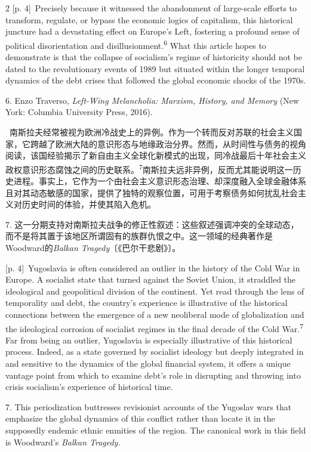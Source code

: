 \documentclass[10pt,a4paper]{article}
\begin{document}
\begin{paracol}{2}
\switchcolumn
{\scriptsize\color{gray} [p. 4]}\ Precisely because it witnessed the abandonment of large-scale efforts to transform, regulate, or bypass the economic logics of capitalism, this historical juncture had a devastating effect on Europe’s Left, fostering a profound sense of political disorientation and disillusionment.\nobreak\textsuperscript{6} What this article hopes to demonstrate is that the collapse of socialism’s regime of historicity should not be dated to the revolutionary events of 1989 but situated within the longer temporal dynamics of the debt crises that followed the global economic shocks of the 1970s.\par{\small 6. Enzo Traverso, \textit{Left-Wing Melancholia: Marxism, History, and Memory} (New York: Columbia University Press, 2016).\par}
\switchcolumn*
{\scriptsize\color{gray} [p. 4]}\ 南斯拉夫经常被视为欧洲冷战史上的异例。作为一个转而反对苏联的社会主义国家，它跨越了欧洲大陆的意识形态与地缘政治分界。然而，从时间性与债务的视角阅读，该国经验揭示了新自由主义全球化新模式的出现，同冷战最后十年社会主义政权意识形态腐蚀之间的历史联\mbox{系。\textsuperscript{7}}南斯拉夫远非异例，反而尤其能说明这一历史进程。事实上，它作为一个由社会主义意识形态治理、却深度融入全球金融体系且对其动态敏感的国家，提供了独特的观察位置，可用于考察债务如何扰乱社会主义对历史时间的体验，并使其陷入危机。\par{\small 7. 这一分期支持对南斯拉夫战争的修正性叙述：这些叙述强调冲突的全球动态，而不是将其置于该地区所谓固有的族群仇恨之中。这一领域的经典著作是Woodward的\textit{Balkan Tragedy}〔《巴尔干悲剧》〕。\par}
\switchcolumn
{\scriptsize\color{gray} [p. 4]}\ Yugoslavia is often considered an outlier in the history of the Cold War in Europe. A socialist state that turned against the Soviet Union, it straddled the ideological and geopolitical division of the continent. Yet read through the lens of temporality and debt, the country’s experience is illustrative of the historical connections between the emergence of a new neoliberal mode of globalization and the ideological corrosion of socialist regimes in the final decade of the Cold War.\nobreak\textsuperscript{7} Far from being an outlier, Yugoslavia is especially illustrative of this historical process. Indeed, as a state governed by socialist ideology but deeply integrated in and sensitive to the dynamics of the global financial system, it offers a unique vantage point from which to examine debt’s role in disrupting and throwing into crisis socialism’s experience of historical time.\par{\small 7. This periodization buttresses revisionist accounts of the Yugoslav wars that emphasize the global dynamics of this conflict rather than locate it in the supposedly endemic ethnic enmities of the region. The canonical work in this field is Woodward’s \textit{Balkan Tragedy.}\par}
\switchcolumn*
\end{paracol}
\end{document}
